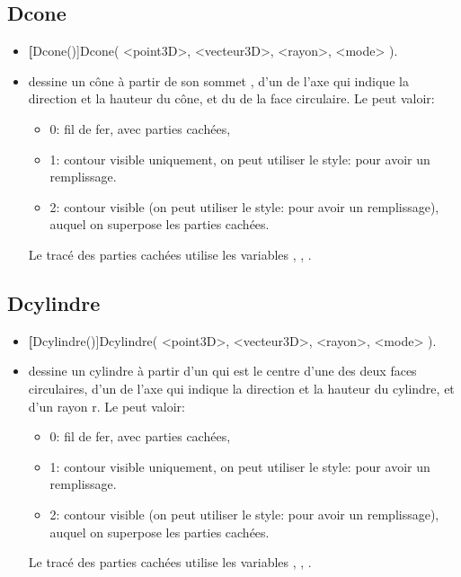 \subsection{Dcone}\label{Dcone}
\begin{itemize}
 \item \util \textbf[Dcone()]{Dcone( <point3D>, <vecteur3D>, <rayon>, <mode> )}.
 \item \desc dessine un cône à partir de son sommet , d'un  de l'axe qui indique la direction et la hauteur du cône, et du  de la face circulaire. Le  peut valoir:

  \begin{itemize}
  \item 0: fil de fer, avec parties cachées,
  \item 1: contour visible uniquement, on peut utiliser le style:  pour avoir un remplissage.
  \item 2: contour visible (on peut utiliser le style:  pour avoir un remplissage), auquel on superpose les parties cachées.
  \end{itemize}

Le tracé des parties cachées utilise les variables , , .
\end{itemize}

\subsection{Dcylindre}\label{Dcylindre}
\begin{itemize}
 \item \util \textbf[Dcylindre()]{Dcylindre( <point3D>, <vecteur3D>, <rayon>, <mode> )}.
 \item \desc dessine un cylindre à partir d'un  qui est le centre d'une des deux faces circulaires, d'un  de l'axe qui indique la direction et la hauteur du cylindre, et d'un rayon r. Le  peut valoir:

  \begin{itemize}
  \item 0: fil de fer, avec parties cachées,
  \item 1: contour visible uniquement, on peut utiliser le style:  pour avoir un remplissage.
  \item 2: contour visible (on peut utiliser le style:  pour avoir un remplissage), auquel on superpose les parties cachées.
  \end{itemize}

Le tracé des parties cachées utilise les variables , , .
\end{itemize}

